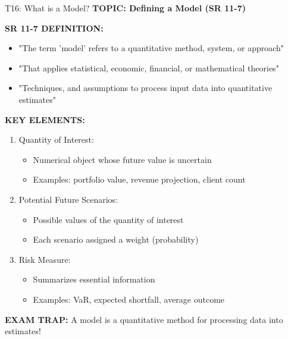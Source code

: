 \documentclass[8pt]{beamer}
\begin{document}
	
	\begin{frame}{T16: What is a Model?}
		\fontsize{6.5}{7.5}\selectfont
		\textbf{TOPIC: Defining a Model (SR 11-7)}
		
		\vspace{0.1cm}
		\textbf{SR 11-7 DEFINITION:}
		\begin{itemize}
			\item "The term 'model' refers to a quantitative method, system, or approach"
			\item "That applies statistical, economic, financial, or mathematical theories"
			\item "Techniques, and assumptions to process input data into quantitative estimates"
		\end{itemize}
		
		\vspace{0.1cm}
		\textbf{KEY ELEMENTS:}
		\begin{enumerate}
			\item \textcolor{myblue}{Quantity of Interest:}
			\begin{itemize}
				\item Numerical object whose future value is uncertain
				\item Examples: portfolio value, revenue projection, client count
			\end{itemize}
			\item \textcolor{myblue}{Potential Future Scenarios:}
			\begin{itemize}
				\item Possible values of the quantity of interest
				\item Each scenario assigned a weight (probability)
			\end{itemize}
			\item \textcolor{myblue}{Risk Measure:}
			\begin{itemize}
				\item Summarizes essential information
				\item Examples: VaR, expected shortfall, average outcome
			\end{itemize}
		\end{enumerate}
		
		\textcolor{myred}{\textbf{EXAM TRAP:}} A model is a \textcolor{myblue}{quantitative method for processing data into estimates}!
	\end{frame}
	
\end{document}
